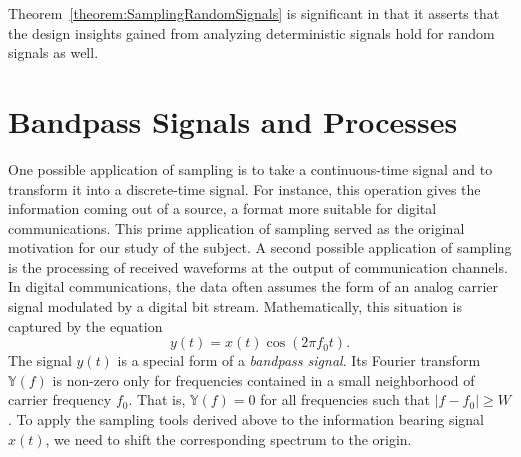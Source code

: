 Theorem~\ref{theorem:SamplingRandomSignals} is significant in that it asserts that the design insights gained from analyzing deterministic signals hold for random signals as well.


\section{Bandpass Signals and Processes}

One possible application of sampling is to take a continuous-time signal and to transform it into a discrete-time signal.
For instance, this operation gives the information coming out of a source, a format more suitable for digital communications.
This prime application of sampling served as the original motivation for our study of the subject.
A second possible application of sampling is the processing of received waveforms at the output of communication channels.
In digital communications, the data often assumes the form of an analog carrier signal modulated by a digital bit stream.
Mathematically, this situation is captured by the equation
\begin{equation*}
y(t) = x(t) \cos (2 \pi f_0 t) .
\end{equation*}
The signal $y(t)$ is a special form of a \emph{bandpass signal}.
Its Fourier transform $\mathbb{Y}(f)$ is non-zero only for frequencies contained in a small neighborhood of carrier frequency $f_0$.
That is, $\mathbb{Y}(f) = 0$ for all frequencies such that $|f - f_0| \geq W$.
To apply the sampling tools derived above to the information bearing signal $x(t)$, we need to shift the corresponding spectrum to the origin.

